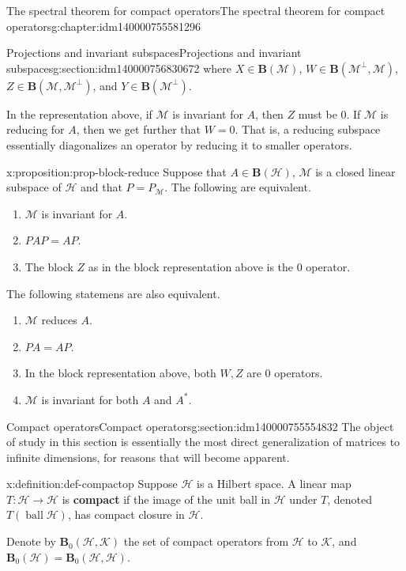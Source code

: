 \documentclass[oneside,10pt,]{book}
\newcommand{\terminology}[1]{\textbf{#1}}
\numberwithin{equation}{section}
\DeclareMathOperator{\ball}{ball}
\newcommand{\hilbert}{\mathcal{H}}
\newcommand{\M}{\mathcal{M}}
\newcommand{\K}{\mathcal{K}}
\newcommand{\BOP}{\mathbf{B}}
\newcommand{\BH}{\mathbf{B}(\mathcal{H})}
\newcommand{\ad}{^\ast}
\numberwithin{equation}{section}
\begin{document}
\begin{chapterptx}{The spectral theorem for compact operators}{}{The spectral theorem for compact operators}{}{}{g:chapter:idm140000755581296}
\begin{sectionptx}{Projections and invariant subspaces}{}{Projections and invariant subspaces}{}{}{g:section:idm140000756830672}
where \(X \in \BOP(\M)\), \(W \in\BOP(\M^\perp, \M)\), \(Z \in  \BOP(\M, \M^\perp)\), and \(Y \in \BOP(\M^\perp)\).%
\par
In the representation above, if \(\M\) is invariant for \(A\), then \(Z\) must be 0. If \(\M\) is reducing for \(A\), then we get further that \(W = 0\). That is, a reducing subspace essentially diagonalizes an operator by reducing it to smaller operators.%
\begin{proposition}{}{}{x:proposition:prop-block-reduce}%
Suppose that \(A \in \BH\), \(\M\) is a closed linear subspace of \(\hilbert\)  and that \(P = P_{\M}\). The following are equivalent.%
\begin{enumerate}
\item{}\(\M\) is invariant for \(A\).%
\item{}\(PAP = AP\).%
\item{}The block \(Z\) as in the block representation above is the \(0\) operator.%
\end{enumerate}
%
\par
The following statemens are also equivalent.%
\begin{enumerate}
\item{}\(\M\) reduces \(A\).%
\item{}\(PA = AP\).%
\item{}In the block representation above, both \(W, Z\) are \(0\) operators.%
\item{}\(\M\) is invariant for both \(A\) and \(A\ad\).%
\end{enumerate}
%
\end{proposition}
\end{sectionptx}
%
%
\typeout{************************************************}
\typeout{************************************************}
%
\begin{sectionptx}{Compact operators}{}{Compact operators}{}{}{g:section:idm140000755554832}
The object of study in this section is essentially the most direct generalization of matrices to infinite dimensions, for reasons that will become apparent.%
\begin{definition}{}{x:definition:def-compactop}%
Suppose \(\hilbert\) is a Hilbert space. A linear map \(T: \hilbert \to \hilbert\) is \terminology{compact} if the image of the unit ball in \(\hilbert\) under \(T\), denoted \(T(\ball \hilbert)\), has compact closure in \(\hilbert\).%
\end{definition}
Denote by \(\BOP_0(\hilbert, \K)\) the set of compact operators from \(\hilbert\) to \(\K\), and \(\BOP_0(\hilbert) = \BOP_0(\hilbert, \hilbert)\).%

\end{sectionptx}
\end{chapterptx}
\end{document}
